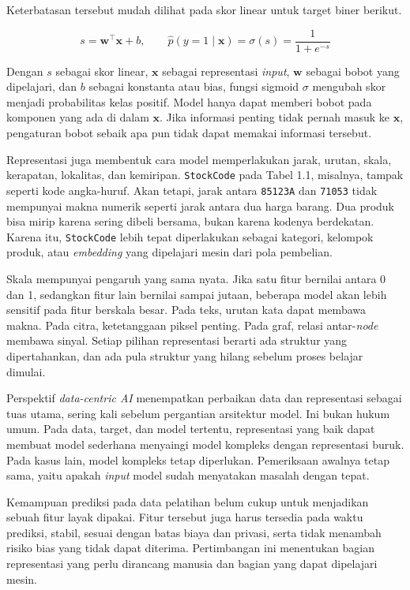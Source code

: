 Keterbatasan tersebut mudah dilihat pada skor linear untuk target biner berikut.

\[
s = \mathbf{w}^{\top}\mathbf{x} + b, \qquad
\hat{p}(y=1\mid\mathbf{x}) = \sigma(s) = \frac{1}{1+e^{-s}}
\]

Dengan \(s\) sebagai skor linear, \(\mathbf{x}\) sebagai representasi \emph{input}, \(\mathbf{w}\) sebagai bobot yang dipelajari, dan \(b\) sebagai konstanta atau bias, fungsi sigmoid \(\sigma\) mengubah skor menjadi probabilitas kelas positif. Model hanya dapat memberi bobot pada komponen yang ada di dalam \(\mathbf{x}\). Jika informasi penting tidak pernah masuk ke \(\mathbf{x}\), pengaturan bobot sebaik apa pun tidak dapat memakai informasi tersebut.

Representasi juga membentuk cara model memperlakukan jarak, urutan, skala, kerapatan, lokalitas, dan kemiripan. \passthrough{\lstinline!StockCode!} pada Tabel 1.1, misalnya, tampak seperti kode angka-huruf. Akan tetapi, jarak antara \passthrough{\lstinline!85123A!} dan \passthrough{\lstinline!71053!} tidak mempunyai makna numerik seperti jarak antara dua harga barang. Dua produk bisa mirip karena sering dibeli bersama, bukan karena kodenya berdekatan. Karena itu, \passthrough{\lstinline!StockCode!} lebih tepat diperlakukan sebagai kategori, kelompok produk, atau \emph{embedding} yang dipelajari mesin dari pola pembelian.

Skala mempunyai pengaruh yang sama nyata. Jika satu fitur bernilai antara 0 dan 1, sedangkan fitur lain bernilai sampai jutaan, beberapa model akan lebih sensitif pada fitur berskala besar. Pada teks, urutan kata dapat membawa makna. Pada citra, ketetanggaan piksel penting. Pada graf, relasi antar-\emph{node} membawa sinyal. Setiap pilihan representasi berarti ada struktur yang dipertahankan, dan ada pula struktur yang hilang sebelum proses belajar dimulai.

Perspektif \emph{data-centric AI} menempatkan perbaikan data dan representasi sebagai tuas utama, sering kali sebelum pergantian arsitektur model. Ini bukan hukum umum. Pada data, target, dan model tertentu, representasi yang baik dapat membuat model sederhana menyaingi model kompleks dengan representasi buruk. Pada kasus lain, model kompleks tetap diperlukan. Pemeriksaan awalnya tetap sama, yaitu apakah \emph{input} model sudah menyatakan masalah dengan tepat.

Kemampuan prediksi pada data pelatihan belum cukup untuk menjadikan sebuah fitur layak dipakai. Fitur tersebut juga harus tersedia pada waktu prediksi, stabil, sesuai dengan batas biaya dan privasi, serta tidak menambah risiko bias yang tidak dapat diterima. Pertimbangan ini menentukan bagian representasi yang perlu dirancang manusia dan bagian yang dapat dipelajari mesin.

